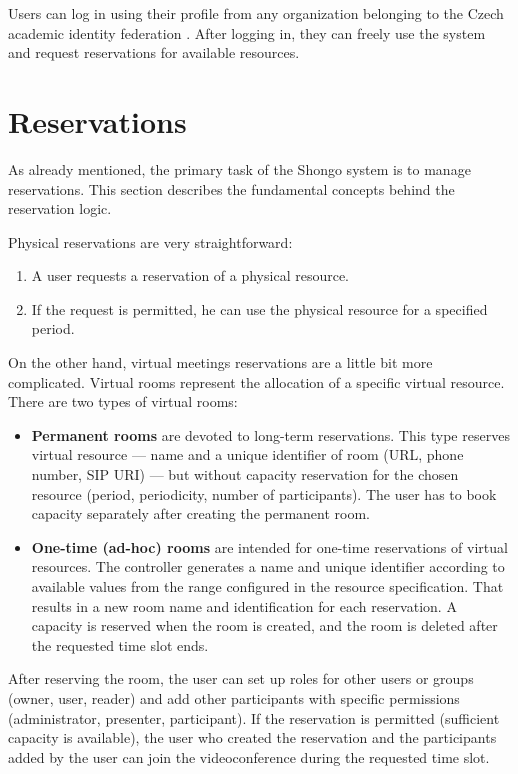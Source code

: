 Users can log in using their profile from any organization belonging to the Czech academic identity federation .
After logging in, they can freely use the system and request reservations for available resources.

\section{Reservations}
As already mentioned, the primary task of the Shongo system is to manage reservations. This section describes the fundamental concepts behind the reservation logic.

Physical reservations are very straightforward:
\begin{enumerate}
    \item A user requests a reservation of a physical resource.
    \item If the request is permitted, he can use the physical resource for a specified period.
\end{enumerate}

On the other hand, virtual meetings reservations are a little bit more complicated. Virtual rooms represent the allocation of a specific virtual resource. There are two types of virtual rooms:
\begin{itemize}
    \item \textbf{Permanent rooms} are devoted to long-term reservations. This type reserves virtual resource --- name and a unique identifier of room (URL, phone number, SIP URI) --- but without capacity reservation for the chosen resource (period, periodicity, number of participants). The user has to book capacity separately after creating the permanent room.
    \item \textbf{One-time (ad-hoc) rooms} are intended for one-time reservations of virtual resources. The controller generates a name and unique identifier according to available values from the range configured in the resource specification. That results in a new room name and identification for each reservation. A capacity is reserved when the room is created, and the room is deleted after the requested time slot ends.
\end{itemize}
After reserving the room, the user can set up roles for other users or groups (owner, user, reader) and add other participants with specific permissions (administrator, presenter, participant).
If the reservation is permitted (sufficient capacity is available), the user who created the reservation and the participants added by the user can join the videoconference during the requested time slot.

